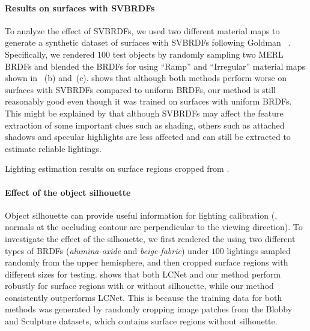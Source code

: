 \paragraph{Results on surfaces with SVBRDFs} 
To analyze the effect of SVBRDFs, we used two different material maps to generate a synthetic dataset of surfaces with SVBRDFs following Goldman \etal~\cite{goldman2010shape}. Specifically, we rendered $100$ test objects by randomly sampling two MERL BRDFs and blended the BRDFs for  using ``Ramp''  and ``Irregular'' material maps shown in ~(b) and~(c).  
 shows that although both methods perform worse on surfaces with SVBRDFs compared to uniform BRDFs, our method is still reasonably good even though it was trained on surfaces with uniform BRDFs.
This might be explained by that although SVBRDFs may affect the feature extraction of some important clues such as shading, others such as attached shadows and specular highlights are less affected and can still be extracted to estimate reliable lightings.

\begin{table}[htbp] \centering
    \caption[Lighting estimation results on surface regions cropped from ]{Lighting estimation results on surface regions cropped from .}
     \label{tab:silhouette}
\end{table}

\paragraph{Effect of the object silhouette}
Object silhouette can provide useful information for lighting calibration (\eg, normals at the occluding contour are perpendicular to the viewing direction). 
To investigate the effect of the silhouette, we first rendered the  using two different types of BRDFs (\textit{alumina-oxide} and \textit{beige-fabric}) under $100$ lightings sampled randomly from the upper hemisphere, and then cropped surface regions with different sizes for testing. 
 shows that both LCNet and our method perform robustly for surface regions with or without silhouette, while our method consistently outperforms LCNet. This is because the training data for both methods was generated by randomly cropping image patches from the Blobby and Sculpture datasets, which contains surface regions without silhouette. %


